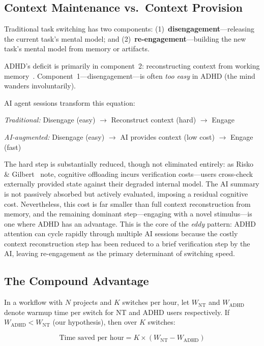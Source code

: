 \documentclass[sigconf,nonacm]{acmart}
\begin{document}
\subsection{Context Maintenance vs.\ Context Provision}

Traditional task switching has two components: (1)~\textbf{disengagement}---releasing the current task's mental model; and (2)~\textbf{re-engagement}---building the new task's mental model from memory or artifacts.

ADHD's deficit is primarily in component~2: reconstructing context from working memory~\cite{martinussen2005}. Component~1---disengagement---is often \emph{too easy} in ADHD (the mind wanders involuntarily).

AI agent sessions transform this equation:

\smallskip
\noindent\textit{Traditional:} Disengage (easy) $\to$ Reconstruct context (hard) $\to$ Engage

\noindent\textit{AI-augmented:} Disengage (easy) $\to$ AI provides context (low cost) $\to$ Engage (fast)
\smallskip

The hard step is substantially reduced, though not eliminated entirely: as Risko \& Gilbert~\cite{risko2016} note, cognitive offloading incurs verification costs---users cross-check externally provided state against their degraded internal model. The AI summary is not passively absorbed but actively evaluated, imposing a residual cognitive cost. Nevertheless, this cost is far smaller than full context reconstruction from memory, and the remaining dominant step---engaging with a novel stimulus---is one where ADHD has an advantage. This is the core of the \emph{eddy} pattern: ADHD attention can cycle rapidly through multiple AI sessions because the costly context reconstruction step has been reduced to a brief verification step by the AI, leaving re-engagement as the primary determinant of switching speed.

\subsection{The Compound Advantage}

In a workflow with $N$ projects and $K$ switches per hour, let $W_{\text{NT}}$ and $W_{\text{ADHD}}$ denote warmup time per switch for NT and ADHD users respectively. If $W_{\text{ADHD}} < W_{\text{NT}}$ (our hypothesis), then over $K$ switches:

\begin{equation}
\text{Time saved per hour} = K \times (W_{\text{NT}} - W_{\text{ADHD}})
\end{equation}
\end{document}

